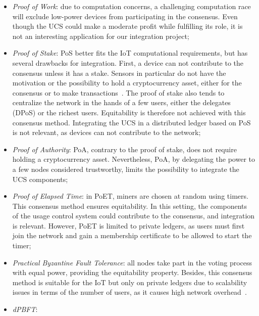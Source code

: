 \begin{itemize}
    \item \emph{Proof of Work}: due to computation concerns, a challenging computation race will exclude low-power devices from participating in the consensus. Even though the UCS could make a moderate profit while fulfilling its role, it is not an interesting application for our integration project; 
    \item  \emph{Proof of Stake}: PoS better fits the IoT computational requirements, but has several drawbacks for integration. First, a device can not contribute to the consensus unless it has a stake. Sensors in particular do not have the motivation or the possibility to hold a cryptocurrency asset, either for the consensus or to make transactions~\cite{Raghav2020}. The proof of stake also tends to centralize the network in the hands of a few users, either the delegates (DPoS) or the richest users. Equitability is therefore not achieved with this consensus method. Integrating the UCS in a distributed ledger based on PoS is not relevant, as devices can not contribute to the network;
    \item \emph{Proof of Authority}: PoA, contrary to the proof of stake, does not require holding a cryptocurrency asset. Nevertheless, PoA, by delegating the power to a few nodes considered trustworthy, limits the possibility to integrate the UCS components;
    \item \emph{Proof of Elapsed Time}: in PoET, miners are chosen at random using timers. This consensus method ensures equitability. In this setting, the components of the usage control system could contribute to the consensus, and integration is relevant. However, PoET is limited to private ledgers, as users must first join the network and gain a membership certificate to be allowed to start the timer; 
     \item \emph{Practical Byzantine Fault Tolerance}: all nodes take part in the voting process with equal power, providing the equitability property. Besides, this consensus method is suitable for the IoT but only on private ledgers due to scalability issues in terms of the number of users, as it causes high network overhead~\cite{Salimitari2020}. 
     \item \emph{dPBFT}: 
\end{itemize}

